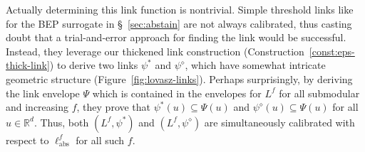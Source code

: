 \documentclass[11pt]{article}
\newcommand{\reals}{\mathbb{R}}
\newcommand{\ellabs}{\ell_{\text{abs}}^f}
\begin{document}
Actually determining this link function is nontrivial.
Simple threshold links like for the BEP surrogate in \S~\ref{sec:abstain} are not always calibrated, thus casting doubt that a trial-and-error approach for finding the link would be successful.
Instead, they leverage our thickened link construction (Construction~\ref{const:eps-thick-link}) to derive two links $\psi^*$ and $\psi^\diamond$, which have somewhat intricate geometric structure (Figure~\ref{fig:lovasz-links}).
Perhaps surprisingly, by deriving the link envelope $\Psi$ which is contained in the envelopes for $L^f$ for all submodular and increasing $f$, they prove that $\psi^*(u) \subseteq \Psi(u)$ and $\psi^\diamond(u) \subseteq \Psi(u)$ for all $u \in \reals^d$.
Thus, both $(L^f, \psi^*)$ and $(L^f, \psi^\diamond)$ are simultaneously calibrated with respect to $\ellabs$ for all such $f$.
\end{document}

